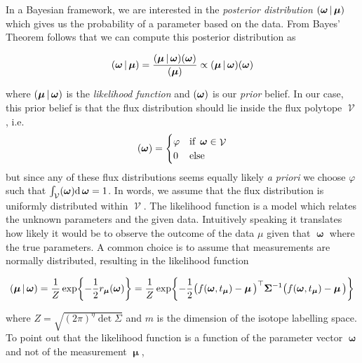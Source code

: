 \documentclass[10pt]{article}
\newcommand{\ie}{i.e.~}
\newcommand{\mb}[1]{\mathbf{#1}}
\let\Pr\relax
\DeclareMathOperator\Pr{\mathbb{P}}
\DeclareMathOperator\fp{\mathcal{V}}
\DeclareMathOperator\bmu{\boldsymbol{\mu}}
\DeclareMathOperator\bomega{\boldsymbol{\omega}}
\begin{document}
In a Bayesian framework, we are interested in the \emph{posterior distribution} $\Pr(\bomega|\bmu)$ 
which gives us the probability of a parameter based on the data. 
From Bayes' Theorem follows that we can compute this posterior distribution as 
\begin{align} 
    \nonumber \\[-12pt]
    \Pr(\bomega|\bmu) = \frac{ \Pr(\bmu|\bomega) \Pr(\bomega) }{ \Pr(\bmu) } \propto \Pr(\bmu|\bomega) \Pr(\bomega) 
    \label{eq:posterior}
    \\[-12pt] \nonumber
\end{align} 
where $\Pr(\bmu|\bomega)$ is the \emph{likelihood function} and $\Pr(\bomega)$ is our \emph{prior} belief.
In our case, this prior belief is that the flux distribution should lie inside the flux polytope $\fp$, 
\ie 
\begin{align} 
    \Pr(\bomega) = \begin{cases}
	\varphi & \text{if } \bomega \in \fp \\
	0 & \text{else}
    \end{cases}
    \label{eq:prior}
\end{align} 
but since any of these flux distributions seems equally likely \emph{a priori} we choose 
$\varphi$ such that $\int_{\fp} \Pr(\bomega) \dd\bomega = 1$.
In words, we assume that the flux distribution is uniformly distributed within $\fp$.
The likelihood function is a model which relates the unknown parameters and the given data.
Intuitively speaking it translates how likely it would be to observe the outcome of the data $\mu$
given that $\bomega$ where the true parameters.
A common choice is to assume that measurements are normally distributed, resulting in the likelihood function
\begin{align}
    \nonumber \\[-12pt]
    \Pr(\bmu|\bomega)	= \frac{1}{Z}\exp{{-\frac{1}{2}r_{\bmu}(\bomega)}} 
    = \frac{1}{Z}\exp{{-\frac{1}{2}\big( f(\bomega, t_{\bmu}) - \bmu \big)^\top \mb{\Sigma}^{-1} \big( f(\bomega, t_{\bmu}) - \bmu \big)}}
    \label{eq:likelihood}
    \\[-12pt] \nonumber
\end{align}
where ${Z=\sqrt{(2\pi)^\eta\det\Sigma}}$ and $m$ is the dimension of the isotope labelling space. 
To point out that the likelihood function is a function of the parameter vector $\bomega$ and not of the measurement $\bmu$,
\end{document}
